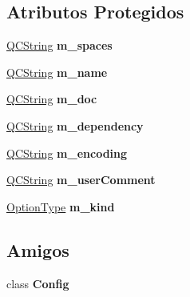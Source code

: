\subsection*{Atributos Protegidos}
\begin{DoxyCompactItemize}
\item 
\hypertarget{class_config_option_a67f3b0a160a31ef3857558f9cf5d28f0}{\hyperlink{class_q_c_string}{Q\-C\-String} {\bfseries m\-\_\-spaces}}\label{class_config_option_a67f3b0a160a31ef3857558f9cf5d28f0}

\item 
\hypertarget{class_config_option_a1deac18ce5712c20300cdf5e6e7d5487}{\hyperlink{class_q_c_string}{Q\-C\-String} {\bfseries m\-\_\-name}}\label{class_config_option_a1deac18ce5712c20300cdf5e6e7d5487}

\item 
\hypertarget{class_config_option_aeb3d8c4cd279017289f24f71ec706449}{\hyperlink{class_q_c_string}{Q\-C\-String} {\bfseries m\-\_\-doc}}\label{class_config_option_aeb3d8c4cd279017289f24f71ec706449}

\item 
\hypertarget{class_config_option_a004bbf8691ea97d8e6ac0a120ab039d8}{\hyperlink{class_q_c_string}{Q\-C\-String} {\bfseries m\-\_\-dependency}}\label{class_config_option_a004bbf8691ea97d8e6ac0a120ab039d8}

\item 
\hypertarget{class_config_option_a24958dbeafb4fdb30fd7c4ce73674bb1}{\hyperlink{class_q_c_string}{Q\-C\-String} {\bfseries m\-\_\-encoding}}\label{class_config_option_a24958dbeafb4fdb30fd7c4ce73674bb1}

\item 
\hypertarget{class_config_option_afe708a88a3934c8d86e521ce0140fbb5}{\hyperlink{class_q_c_string}{Q\-C\-String} {\bfseries m\-\_\-user\-Comment}}\label{class_config_option_afe708a88a3934c8d86e521ce0140fbb5}

\item 
\hypertarget{class_config_option_adbdd105aaea61a52e29a0e2ff815a18c}{\hyperlink{class_config_option_a976bded296a67e09242af85291a639d6}{Option\-Type} {\bfseries m\-\_\-kind}}\label{class_config_option_adbdd105aaea61a52e29a0e2ff815a18c}

\end{DoxyCompactItemize}
\subsection*{Amigos}
\begin{DoxyCompactItemize}
\item 
\hypertarget{class_config_option_ac3da7e21a05bf8852638db7e4dd1b81a}{class {\bfseries Config}}\label{class_config_option_ac3da7e21a05bf8852638db7e4dd1b81a}

\end{DoxyCompactItemize}


